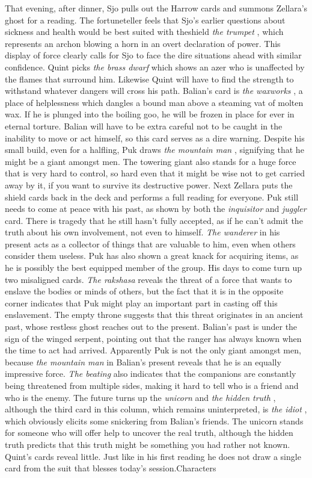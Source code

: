 That evening, after dinner, Sjo pulls out the Harrow cards and summons Zellara's ghost for a reading. The fortuneteller feels that Sjo's earlier questions about sickness and health would be best suited with theshield  {\itshape the trumpet} , which represents an archon blowing a horn in an overt declaration of power. This display of force clearly calls for Sjo to face the dire situations ahead with similar confidence. Quint picks  {\itshape the brass dwarf} which shows an azer who is unaffected by the flames that surround him. Likewise Quint will have to find the strength to withstand whatever dangers will cross his path. Balian's card is  {\itshape the waxworks} , a place of helplessness which dangles a bound man above a steaming vat of molten wax. If he is plunged into the boiling goo, he will be frozen in place for ever in eternal torture. Balian will have to be extra careful not to be caught in the inability to move or act himself, so this card serves as a dire warning. Despite his small build, even for a halfling, Puk draws  {\itshape the mountain man} , signifying that he might be a giant amongst men. The towering giant also stands for a huge force that is very hard to control, so hard even that it might be wise not to get carried away by it, if you want to survive its destructive power. Next Zellara puts the shield cards back in the deck and performs a full reading for everyone. Puk still needs to come at peace with his past, as shown by both the {\itshape inquisitor} and  {\itshape juggler} card. There is tragedy that he still hasn't fully accepted, as if he can't admit the truth about his own involvement, not even to himself.  {\itshape The wanderer} in his present acts as a collector of things that are valuable to him, even when others consider them useless. Puk has also shown a great knack for acquiring items, as he is possibly the best equipped member of the group. His days to come turn up two misaligned cards.  {\itshape The rakshasa} reveals the threat of a force that wants to enslave the bodies or minds of others, but the fact that it is in the opposite corner indicates that Puk might play an important part in casting off this enslavement. The empty throne suggests that this threat originates in an ancient past, whose restless ghost reaches out to the present. Balian's past is under the sign of the winged serpent, pointing out that the ranger has always known when the time to act had arrived. Apparently Puk is not the only giant amongst men, because {\itshape the mountain man} in Balian's present reveals that he is an equally impressive force.  {\itshape The beating} also indicates that the companions are constantly being threatened from multiple sides, making it hard to tell who is a friend and who is the enemy. The future turns up the  {\itshape unicorn} and  {\itshape the hidden truth} , although the third card in this column, which remains uninterpreted, is  {\itshape the idiot} , which obviously elicits some snickering from Balian's friends. The unicorn stands for someone who will offer help to uncover the real truth, although the hidden truth predicts that this truth might be something you had rather not known. Quint's cards reveal little. Just like in his first reading he does not draw a single card from the suit that blesses today's session.Characters 